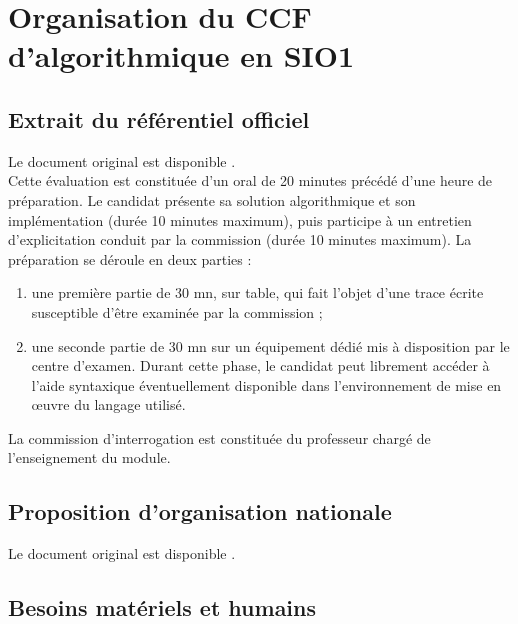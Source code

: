 \documentclass[a4paper,12pt,french]{book}
\begin{document}
\section*{Organisation du CCF d'algorithmique en SIO1}
\subsection*{Extrait du référentiel officiel}

Le document original est disponible .\\


Cette évaluation est constituée d'un oral de 20 minutes précédé d'une heure de préparation. Le
candidat présente sa solution algorithmique et son implémentation (durée 10 minutes maximum),
puis participe à un entretien d'explicitation conduit par la commission (durée 10 minutes maximum).
La préparation se déroule en deux parties :
\begin{enumerate}[--]
	\item une première partie de 30 mn, sur table, qui fait l'objet d'une trace écrite susceptible d'être
    examinée par la commission ;
    \item une seconde partie de 30 mn sur un équipement dédié mis à disposition par le centre
    d'examen. Durant cette phase, le candidat peut librement accéder à l'aide syntaxique
    éventuellement disponible dans l'environnement de mise en œuvre du langage utilisé.
    \end{enumerate}
La commission d'interrogation est constituée du professeur chargé de l'enseignement du module.

\subsection*{Proposition d'organisation nationale}

Le document original est disponible .\\


\subsection*{Besoins matériels et humains}
\end{document}
